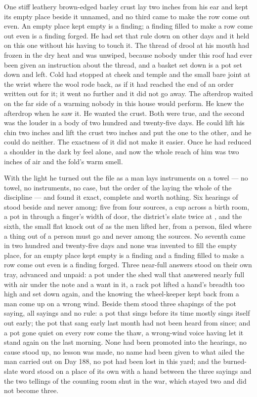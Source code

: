 One stiff leathery brown-edged barley crust lay two inches from his ear and kept its empty place beside it unnamed, and no third came to make the row come out even. An empty place kept empty is a finding; a finding filled to make a row come out even is a finding forged. He had set that rule down on other days and it held on this one without his having to touch it. The thread of drool at his mouth had frozen in the dry heat and was unwiped, because nobody under this roof had ever been given an instruction about the thread, and a basket set down is a pot set down and left. Cold had stopped at cheek and temple and the small bare joint at the wrist where the wool rode back, as if it had reached the end of an order written out for it; it went no further and it did not go away. The afterdrop waited on the far side of a warming nobody in this house would perform. He knew the afterdrop when he saw it. He wanted the crust. Both were true, and the second was the louder in a body of two hundred and twenty-five days. He could lift his chin two inches and lift the crust two inches and put the one to the other, and he could do neither. The exactness of it did not make it easier. Once he had reduced a shoulder in the dark by feel alone, and now the whole reach of him was two inches of air and the fold's warm smell.

With the light he turned out the file as a man lays instruments on a towel --- no towel, no instruments, no case, but the order of the laying the whole of the discipline --- and found it exact, complete and worth nothing. Six hearings of  stood beside and never among: five from four sources, a cup across a birth room, a pot in  through a finger's width of door, the district's slate twice at , and the sixth, the small flat knock out of  as the men lifted her, from a person, filed where a thing out of a person must go and never among the sources. No seventh came in two hundred and twenty-five days and none was invented to fill the empty place, for an empty place kept empty is a finding and a finding filled to make a row come out even is a finding forged. Three near-full answers stood on their own tray, advanced and unpaid: a pot under the shed wall that answered nearly full with air under the note and a want in it, a rack pot lifted a hand's breadth too high and set down again, and the knowing the wheel-keeper kept back from a man come up on a wrong wind. Beside them stood three shapings of the pot saying, all sayings and no rule: a pot that sings before its time mostly sings itself out early; the pot that sang early last month had not been heard from since; and a pot gone quiet on every row come the thaw, a wrong-wind voice having let it stand again on the last morning. None had been promoted into the hearings, no cause stood up, no lesson was made, no name had been given to what ailed the man carried out on Day 188, no pot had been lost in this yard; and the burned-slate word stood on a place of its own with a hand between the three sayings and the two tellings of the counting room shut in the war, which stayed two and did not become three.

